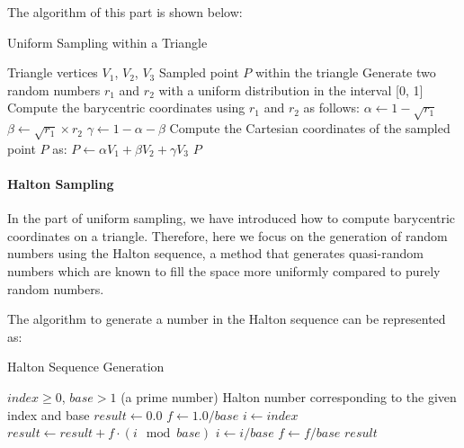 \documentclass[11pt, a4paper,oneside,chapterprefix=false]{scrbook}
\begin{document}
\vspace{10pt}

The algorithm of this part is shown below: 

\begin{algorithm}
\caption{Uniform Sampling within a Triangle}\label{alg:uniform_sampling}
\begin{algorithmic}
\Require Triangle vertices \(V_1\), \(V_2\), \(V_3\)
\Ensure Sampled point \(P\) within the triangle
\State Generate two random numbers \(r_1\) and \(r_2\) with a uniform distribution in the interval [0, 1]
\State Compute the barycentric coordinates using \(r_1\) and \(r_2\) as follows:
\State \hspace{0.5cm} \( \alpha \gets 1 - \sqrt{r_1} \)
\State \hspace{0.5cm} \( \beta \gets \sqrt{r_1} \times r_2 \)
\State \hspace{0.5cm} \( \gamma \gets 1 - \alpha - \beta \)
\State Compute the Cartesian coordinates of the sampled point \(P\) as:
\State \hspace{0.5cm} \( P \gets \alpha V_1 + \beta V_2 + \gamma V_3 \)
\State \Return \(P\)
\end{algorithmic}
\end{algorithm}


\paragraph{Halton Sampling}

In the part of uniform sampling, we have introduced how to compute barycentric coordinates on a triangle. Therefore, here we focus on the generation of random numbers using the Halton sequence, a method that generates quasi-random numbers which are known to fill the space more uniformly compared to purely random numbers.

The algorithm to generate a number in the Halton sequence can be represented as:

\begin{algorithm}[H]
\caption{Halton Sequence Generation}\label{alg:halton}
\begin{algorithmic}
\Require $index \geq 0$, $base > 1$ (a prime number)
\Ensure Halton number corresponding to the given index and base
\State $result \gets 0.0$
\State $f \gets 1.0 / base$
\State $i \gets index$
    \State $result \gets result + f \cdot (i \mod base)$
    \State $i \gets i / base$  
    \State $f \gets f / base$
\EndWhile
\State \Return $result$
\end{algorithmic}
\end{algorithm}
\end{document}
